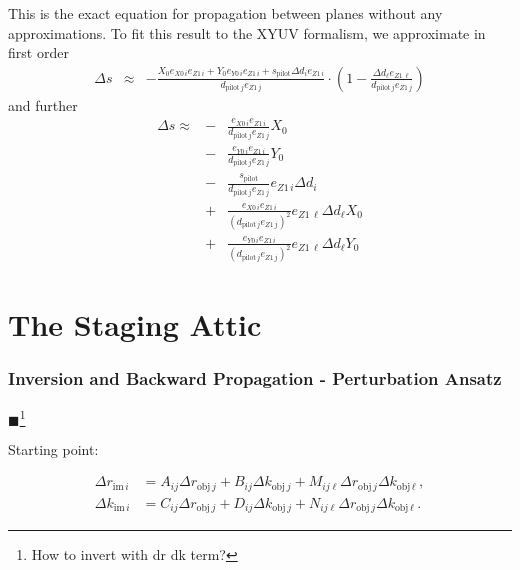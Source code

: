 \documentclass[12pt,a4paper,twoside,openright,BCOR10mm,headsepline,titlepage,abstracton,chapterprefix,final]{scrreprt}
\newcommand\Vector[1]{{\mathbf{#1}}}
\newcommand\Location{\Vector{r}}
\newcommand{\remark}[1]{{\color{red}$\blacksquare$}\footnote{{\color{red}#1}}}
\begin{document}
This is the exact equation for propagation between planes without any approximations.
To fit this result to the XYUV formalism, we approximate in first order
\begin{eqnarray}
  \Delta s &\approx& - \frac{ X_0 e_{X0\,i}e_{Z1\,i} + Y_0 e_{Y0\,i}e_{Z1\,i} + s_{\text{pilot}} \Delta d_i e_{Z1\,i}  }
                            {d_{\text{pilot}\,j} e_{Z1\,j}}
                            \cdot
                            \left(
                            1 - \frac{ \Delta d_{\ell} e_{Z1\,\ell}}{d_{\text{pilot}\,j} e_{Z1\,j}}
                            \right)
\end{eqnarray}
and further
\begin{eqnarray}
  \Delta s \approx &-& \frac{  e_{X0\,i}e_{Z1\,i} }{d_{\text{pilot}\,j} e_{Z1\,j}} X_0 \nonumber\\
                   &-& \frac{  e_{Y0\,i}e_{Z1\,i} }{d_{\text{pilot}\,j} e_{Z1\,j}} Y_0 \nonumber\\
                   &-& \frac{ s_{\text{pilot}}   }{d_{\text{pilot}\,j} e_{Z1\,j}}e_{Z1\,i} \Delta d_i \nonumber\\
                   &+& \frac{ e_{X0\,i}e_{Z1\,i} }{ (d_{\text{pilot}\,j} e_{Z1\,j} )^2 }
                             e_{Z1\,\ell} \Delta d_{\ell} X_0  \nonumber\\
                   &+& \frac{ e_{Y0\,i}e_{Z1\,i} }{ (d_{\text{pilot}\,j} e_{Z1\,j} )^2 }
                             e_{Z1\,\ell} \Delta d_{\ell} Y_0 
\end{eqnarray}





\chapter{The Staging Attic}

\subsection{Inversion and Backward Propagation - Perturbation Ansatz}

\remark{How to invert with dr dk term?}

\newcommand{\dr}[2]{\Delta {r}_{#1\,#2}}
\newcommand{\dk}[2]{\Delta {k}_{#1\,#2}}

Starting point:

\begin{eqnarray}
 \dr{\text{im}}{i} & = A_{ij} \dr{\text{obj}}{j} + B_{ij} \dk{\text{obj}}{j} + M_{ij\ell} \dr{\text{obj}}{j} \dk{\text{obj}}{\ell}\,,\\
 \dk{\text{im}}{i} & = C_{ij} \dr{\text{obj}}{j} + D_{ij} \dk{\text{obj}}{j} + N_{ij\ell} \dr{\text{obj}}{j} \dk{\text{obj}}{\ell}\,.
\end{eqnarray}
\end{document}

